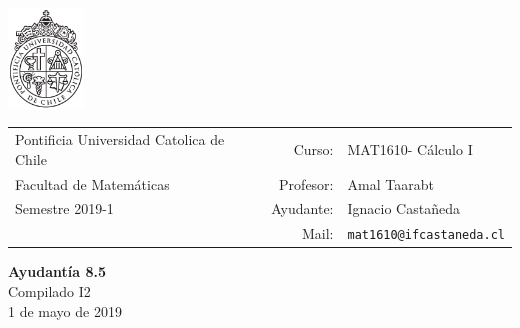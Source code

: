\documentclass[12pt]{article}
\makeatletter
\newcommand{\ayudantia}{{\sc Ayudantía 8.5}}
\newcommand{\tituloayu}{Compilado I2}
\newcommand{\fecha}{1 de mayo de 2019}
\newcommand{\sigla}{MAT1610}
\newcommand{\nombre}{Cálculo I}
\newcommand{\profesor}{Amal Taarabt}
\newcommand{\ano}{2019}
\newcommand{\semestre}{1}
\newcommand{\mail}{mat1610@ifcastaneda.cl}
\makeatother
\begin{document}
\thispagestyle{empty}

\begin{minipage}{2cm}
	\includegraphics[width=2cm]{../../../../img/logo.pdf}
	\vspace{0.5cm}
\end{minipage}
\begin{minipage}{\linewidth}
	\begin{tabular}{lrl}
		{\scriptsize\sc Pontificia Universidad Catolica de Chile} & \hspace*{0.7in}Curso: &
		\sigla  - \nombre\\
		{\sc Facultad de Matemáticas}&
		Profesor: & \profesor \\
		{\sc Semestre \ano-\semestre} & Ayudante: & {Ignacio Castañeda}\\
		& {Mail:} & \texttt{\mail}
	\end{tabular}
\end{minipage}

\vspace{-10mm}
\begin{center}
	{\LARGE\bf \ayudantia}\\
	\vspace{0.1cm}
	{\tituloayu}\\
	\vspace{0.1cm}
	\fecha\\
	\vspace{0.4cm}
\end{center}
\end{document}
